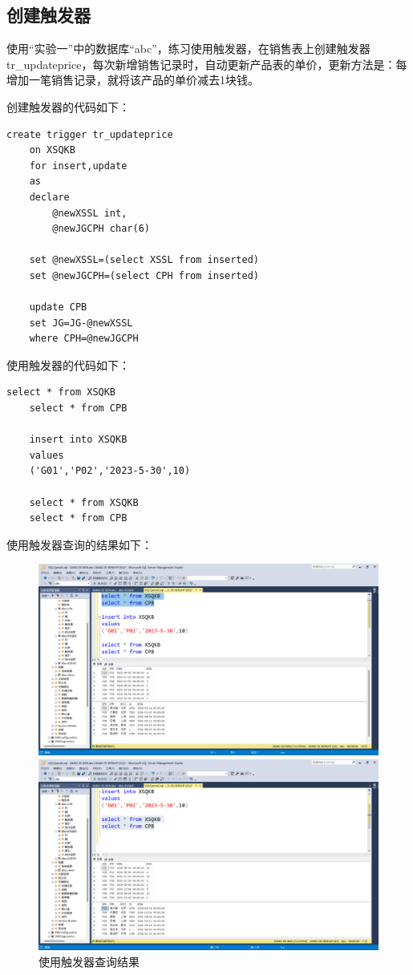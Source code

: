 \documentclass[UTF8,12pt]{article}
\begin{document}
\subsection{创建触发器}
使用“实验一”中的数据库“abc”，练习使用触发器，在销售表上创建触发器tr\_updateprice，每次新增销售记录时，自动更新产品表的单价，更新方法是：每增加一笔销售记录，就将该产品的单价减去1块钱。

创建触发器的代码如下：
\begin{lstlisting}[title=创建触发器,frame=shadowbox]
    create trigger tr_updateprice
    on XSQKB
    for insert,update
    as
    declare
        @newXSSL int,
        @newJGCPH char(6)
    
    set @newXSSL=(select XSSL from inserted)
    set @newJGCPH=(select CPH from inserted)
    
    update CPB
    set JG=JG-@newXSSL
    where CPH=@newJGCPH
\end{lstlisting}

使用触发器的代码如下：
\begin{lstlisting}[title=使用触发器,frame=shadowbox]
    select * from XSQKB
    select * from CPB
    
    insert into XSQKB
    values
    ('G01','P02','2023-5-30',10)
    
    select * from XSQKB
    select * from CPB
\end{lstlisting}

使用触发器查询的结果如下：
\begin{figure}[htbp]
	\centering
	\begin{minipage}{0.49\linewidth}
		\centering
		\includegraphics[width=0.9\linewidth]{img/5.png}
	\end{minipage}
	\begin{minipage}{0.49\linewidth}
		\centering
		\includegraphics[width=0.9\linewidth]{img/6.png}
	\end{minipage}
    \caption{使用触发器查询结果}
\end{figure}
\end{document}

